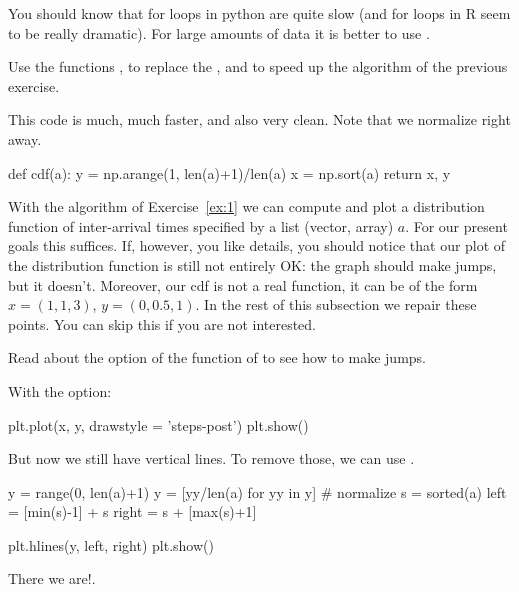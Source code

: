 You should know that for loops in python are quite slow (and for loops in R seem to be really dramatic). For large amounts of data it is better to use . 


\begin{exercise}\label{ex:1}
  Use the  functions , to replace the , and  to speed up the algorithm of the previous exercise. 
  \begin{solution}
    This code is much, much faster, and also very clean. Note that we normalize  right away. 
\begin{pyverbatim}
def cdf(a):
    y = np.arange(1, len(a)+1)/len(a)
    x = np.sort(a)
    return x, y
  
\end{pyverbatim}
  \end{solution}
\end{exercise}


With the algorithm of Exercise~\ref{ex:1} we can compute and plot a distribution function of inter-arrival times specified by a list (vector, array) $a$.
For our present goals this suffices.
If, however, you like details, you should notice that our plot of the distribution function is still not entirely OK: the graph should make jumps, but it doesn't.
Moreover, our cdf is not a real function, it can be of the form $x=(1,1,3)$, $y=(0, 0.5, 1)$.
In the rest of this subsection we repair these points.
You can skip this if you are not interested.

\begin{exercise}
Read about the  option of the  function of  to see how to make jumps.
  \begin{solution}
With the  option: 
\begin{pyverbatim}
plt.plot(x, y,  drawstyle = 'steps-post')
plt.show()
\end{pyverbatim}


But now we still have vertical lines. To remove those, we can use .

\begin{pyverbatim}
y = range(0, len(a)+1)
y = [yy/len(a) for yy in y] # normalize
s = sorted(a)
left = [min(s)-1] + s
right = s + [max(s)+1]

plt.hlines(y, left, right)
plt.show()
\end{pyverbatim}

There  we are!.
  \end{solution}
\end{exercise}


